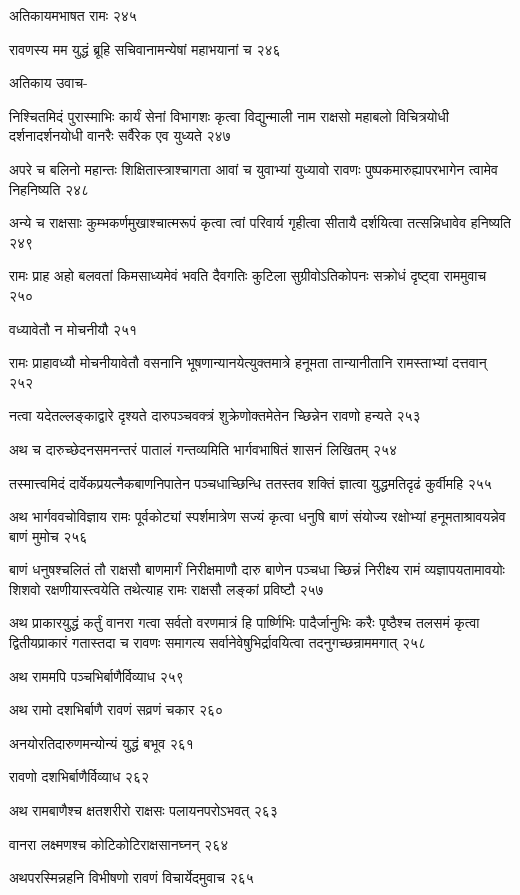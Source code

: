 अतिकायमभाषत रामः २४५

रावणस्य मम युद्धं ब्रूहि सचिवानामन्येषां महाभयानां च २४६

अतिकाय उवाच-

निश्चितमिदं पुरास्माभिः कार्यं सेनां विभागशः कृत्वा विद्युन्माली नाम राक्षसो महाबलो
विचित्रयोधी दर्शनादर्शनयोधी वानरैः सर्वैरेक एव युध्यते २४७

अपरे च बलिनो महान्तः शिक्षितास्त्राश्चागता आवां च युवाभ्यां युध्यावो रावणः
पुष्पकमारुह्यापरभागेन त्वामेव निहनिष्यति २४८

अन्ये च राक्षसाः कुम्भकर्णमुखाश्चात्मरूपं कृत्वा त्वां परिवार्य गृहीत्वा सीतायै दर्शयित्वा
तत्सन्निधावेव हनिष्यति २४९

रामः प्राह अहो बलवतां किमसाध्यमेवं भवति दैवगतिः कुटिला सुग्रीवोऽतिकोपनः सक्रोधं
दृष्ट्वा राममुवाच २५०

वध्यावेतौ न मोचनीयौ २५१

रामः प्राहावध्यौ मोचनीयावेतौ वसनानि भूषणान्यानयेत्युक्तमात्रे हनूमता तान्यानीतानि
रामस्ताभ्यां दत्तवान् २५२

नत्वा यदेतल्लङ्काद्वारे दृश्यते दारुपञ्चवक्त्रं शुक्रेणोक्तमेतेन च्छिन्नेन रावणो हन्यते २५३

अथ च दारुच्छेदनसमनन्तरं पातालं गन्तव्यमिति भार्गवभाषितं शासनं लिखितम् २५४

तस्मात्त्वमिदं दार्वेकप्रयत्नैकबाणनिपातेन पञ्चधाच्छिन्धि ततस्तव शक्तिं ज्ञात्वा युद्धमतिदृढं
कुर्वीमहि २५५

अथ भार्गववचोविज्ञाय रामः पूर्वकोट्यां स्पर्शमात्रेण सज्यं कृत्वा धनुषि बाणं संयोज्य
रक्षोभ्यां हनूमताश्रावयन्नेव बाणं मुमोच २५६

बाणं धनुषश्चलितं तौ राक्षसौ बाणमार्गं निरीक्षमाणौ दारु बाणेन पञ्चधा च्छिन्नं निरीक्ष्य
रामं व्यज्ञापयतामावयोः शिशवो रक्षणीयास्त्वयेति तथेत्याह रामः राक्षसौ लङ्कां प्रविष्टौ
 २५७

अथ प्राकारयुद्धं कर्तुं वानरा गत्वा सर्वतो वरणमात्रं हि पार्ष्णिभिः पादैर्जानुभिः करैः
पृष्ठैश्च तलसमं कृत्वा द्वितीयप्राकारं गतास्तदा च रावणः समागत्य सर्वानेवेषुभिर्द्रावयित्वा
तदनुगच्छन्राममगात् २५८

अथ राममपि पञ्चभिर्बाणैर्विव्याध २५९

अथ रामो दशभिर्बाणै रावणं सव्रणं चकार २६०

अनयोरतिदारुणमन्योन्यं युद्धं बभूव २६१

रावणो दशभिर्बाणैर्विव्याध २६२

अथ रामबाणैश्च क्षतशरीरो राक्षसः पलायनपरोऽभवत् २६३

वानरा लक्ष्मणश्च कोटिकोटिराक्षसानघ्नन् २६४

अथपरस्मिन्नहनि विभीषणो रावणं विचार्येदमुवाच २६५

